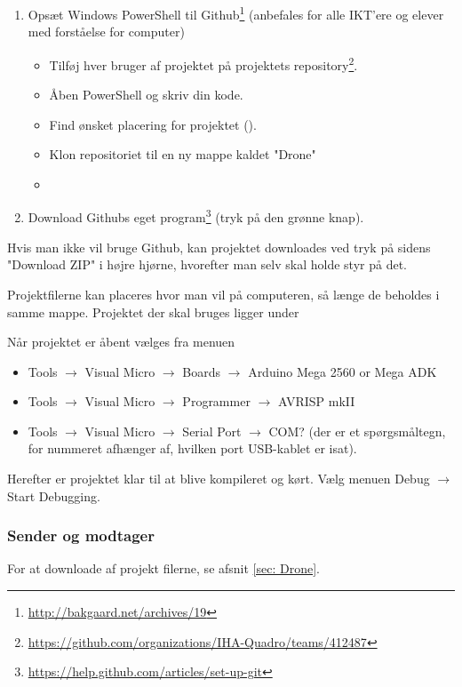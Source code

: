 \documentclass[Main]{subfiles}
\begin{document}
\begin{enumerate}
\item Opsæt Windows PowerShell til Github\footnote{\url{http://bakgaard.net/archives/19}} (anbefales for alle IKT'ere og elever med forståelse for computer)
	\begin{itemize}
	\item Tilføj hver bruger af projektet på projektets repository\footnote{\url{https://github.com/organizations/IHA-Quadro/teams/412487}}.
	\item Åben PowerShell og skriv din kode.
	\item Find ønsket placering for projektet ().
	\item Klon repositoriet til en ny mappe kaldet "Drone" 
	\item[] 
	\end{itemize}
\item Download Githubs eget program\footnote{\url{https://help.github.com/articles/set-up-git}} (tryk på den grønne knap).
\end{enumerate}

Hvis man ikke vil bruge Github, kan projektet downloades ved tryk på sidens "Download ZIP" i højre hjørne, hvorefter man selv skal holde styr på det.

Projektfilerne kan placeres hvor man vil på computeren, så længe de beholdes i samme mappe.
Projektet der skal bruges ligger under 

Når projektet er åbent vælges fra menuen 
\begin{itemize}
\item Tools $\rightarrow$ Visual Micro $\rightarrow$ Boards $\rightarrow$ Arduino Mega 2560 or Mega ADK
\item Tools $\rightarrow$ Visual Micro $\rightarrow$ Programmer $\rightarrow$ AVRISP mkII
\item Tools $\rightarrow$ Visual Micro $\rightarrow$ Serial Port $\rightarrow$ COM? (der er et spørgsmåltegn, for nummeret afhænger af, hvilken port USB-kablet er isat).
\end{itemize}

Herefter er projektet klar til at blive kompileret og kørt.
Vælg menuen Debug $\rightarrow$ Start Debugging.


\subsubsection{Sender og modtager}
For at downloade af projekt filerne, se afsnit \ref{sec: Drone}.
\end{document}
